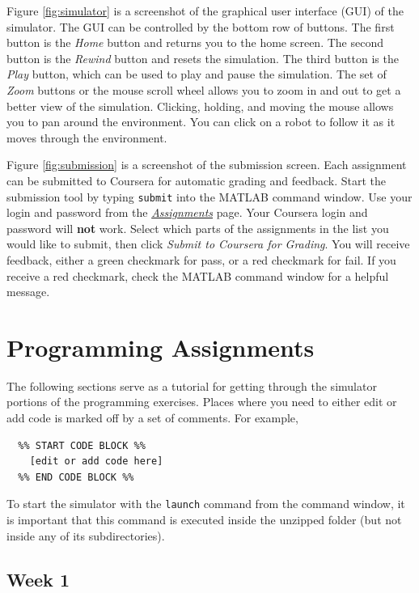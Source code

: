 \documentclass[10pt]{article}
\begin{document}
Figure \ref{fig:simulator} is a screenshot of the graphical user interface (GUI) of the simulator. The GUI can be controlled by the bottom row of buttons. The first button is the \textit{Home} button and returns you to the home screen. The second button is the \textit{Rewind} button and resets the simulation. The third button is the \textit{Play} button, which can be used to play and pause the simulation. The set of \textit{Zoom} buttons or the mouse scroll wheel allows you to zoom in and out to get a better view of the simulation. Clicking, holding, and moving the mouse allows you to pan around the environment. You can click on a robot to follow it as it moves through the environment.

Figure \ref{fig:submission} is a screenshot of the submission screen. Each assignment can be submitted to Coursera for automatic grading and feedback. Start the submission tool by typing \texttt{submit} into the MATLAB command window. Use your login and password from the \href{https://class.coursera.org/conrob-002/assignment/list}{\textit{Assignments}} page. Your Coursera login and password will \textbf{not} work. Select which parts of the assignments in the list you would like to submit, then click \textit{Submit to Coursera for Grading}. You will receive feedback, either a green checkmark for pass, or a red checkmark for fail. If you receive a red checkmark, check the MATLAB command window for a helpful message.

\newpage
\section{Programming Assignments}

The following sections serve as a tutorial for getting through the simulator portions of the programming exercises. Places where you need to either edit or add code is marked off by a set of comments. For example,

\begin{verbatim}
  %% START CODE BLOCK %%
    [edit or add code here]
  %% END CODE BLOCK %%
\end{verbatim}

To start the simulator with the \texttt{launch} command from the command window, it is important that this command is executed inside the unzipped folder (but not inside any of its subdirectories).

\subsection{Week 1}
\end{document}
